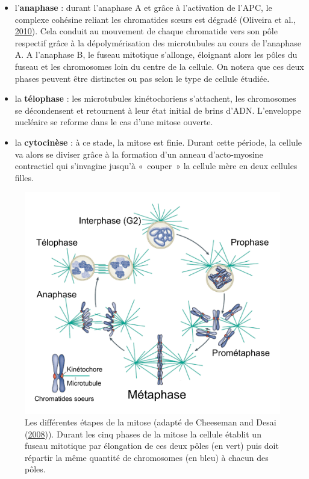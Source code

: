 \documentclass[12pt,a4paper,twoside,openright]{book}
\begin{document}
\begin{itemize}
\item
  l'\textbf{anaphase} : durant l'anaphase A et grâce à l'activation de
  l'APC, le complexe cohésine reliant les chromatides sœurs est dégradé
  (Oliveira et al., \protect\hyperlink{ref-Oliveira2010}{2010}). Cela
  conduit au mouvement de chaque chromatide vers son pôle respectif
  grâce à la dépolymérisation des microtubules au cours de l'anaphase A.
  A l'anaphase B, le fuseau mitotique s'allonge, éloignant alors les
  pôles du fuseau et les chromosomes loin du centre de la cellule. On
  notera que ces deux phases peuvent être distinctes ou pas selon le
  type de cellule étudiée.
\item
  la \textbf{télophase} : les microtubules kinétochoriens s'attachent,
  les chromosomes se décondensent et retournent à leur état initial de
  brins d'ADN. L'enveloppe nucléaire se reforme dans le cas d'une mitose
  ouverte.
\item
  la \textbf{cytocinèse} : à ce stade, la mitose est finie. Durant cette
  période, la cellule va alors se diviser grâce à la formation d'un
  anneau d'acto-myosine contractiel qui s'invagine jusqu'à «~couper~» la
  cellule mère en deux cellules filles.
\end{itemize}

\begin{figure}[htbp]
\centering
\includegraphics{figures/intro/mitosis.png}
\caption[Les différentes étapes de la mitose]{\label{fig:mitosis}Les
différentes étapes de la mitose (adapté de Cheeseman and Desai
(\protect\hyperlink{ref-Cheeseman2008}{2008})). Durant les cinq phases
de la mitose la cellule établit un fuseau mitotique par élongation de
ces deux pôles (en vert) puis doit répartir la même quantité de
chromosomes (en bleu) à chacun des pôles.}
\end{figure}
\end{document}
